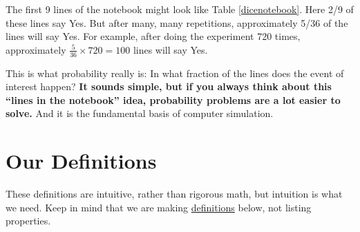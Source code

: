 The first 9 lines of the notebook might look like Table
\ref{dicenotebook}.  Here 2/9 of these lines say Yes.  But after many,
many repetitions, approximately 5/36 of the lines will say Yes.  For
example, after doing the experiment 720 times, approximately
$\frac{5}{36} \times 720 = 100$ lines will say Yes.

This is what probability really is:  In what fraction of the lines does
the event of interest happen?  {\bf It sounds simple, but if you always
think about this ``lines in the notebook'' idea, probability problems
are a lot easier to solve.}  And it is the fundamental basis of computer
simulation.

\section{Our Definitions}
\label{probdefs}

These definitions are intuitive, rather than rigorous math, but 
intuition is what we need.  Keep in mind that we are making
\underline{definitions} below, not listing properties.

